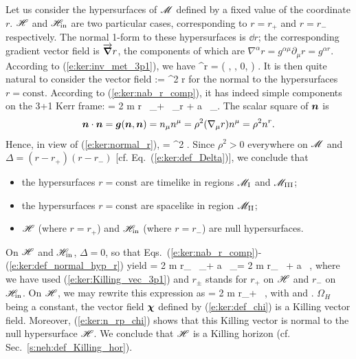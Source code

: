 Let us consider the hypersurfaces of $\mathscr{M}$ defined by a fixed value of
the coordinate $r$. $\mathscr{H}$ and $\mathscr{H}_{\rm in}$ are two particular cases,
corresponding to $r=r_+$ and $r=r_-$ respectively.
The normal 1-form to these hypersurfaces is $\dd r$; the corresponding
gradient vector field is $\overrightarrow{\bm{\nabla}} r$, the components of which are
$\nabla^\alpha r = g^{\alpha\mu} \partial_\mu r = g^{\alpha r}$.
According to (\ref{e:ker:inv_met_3p1}), we have
\be \label{e:ker:nab_r_comp}
    \nabla^\alpha r = \left( , , 0, 
            \right) .
\ee
It is then quite natural to consider the vector field
\be \label{e:ker:def_normal_hyp_r}
     := \rho^2 \vw{\nabla} r
\ee
for the normal to the hypersurfaces $r=\mathrm{const}$. According to (\ref{e:ker:nab_r_comp}),
it has indeed simple components on the 3+1 Kerr frame:
\be \label{e:ker:normal_r}
     = 2 m r \, \wpar_\ti + \Delta \, \wpar_{\tilde r} + a \, \wpar_\tph .
\ee
The scalar square of $\bm{n}$ is
\[
    \bm{n}\cdot\bm{n} = \bm{g}(\bm{n},\bm{n}) = n_\mu n^\mu = \rho^2 (\nabla_\mu r) n^\mu
    = \rho^2 n^r .
\]
Hence, in view of (\ref{e:ker:normal_r}),
\be
    \cdot{} = \rho^2 \Delta .
\ee
Since $\rho^2>0$ everywhere on $\mathscr{M}$ and $\Delta = (r-r_+)(r-r_-)$ [cf. Eq.~(\ref{e:ker:def_Delta})], we conclude that
\begin{itemize}
\item the hypersurfaces $r=\mathrm{const}$ are timelike in regions $\mathscr{M}_{\rm I}$ and $\mathscr{M}_{\rm III}$;
\item the hypersurfaces $r=\mathrm{const}$ are spacelike in region $\mathscr{M}_{\rm II}$;
\item $\mathscr{H}$ (where $r=r_+$) and $\mathscr{H}_{\rm in}$ (where $r=r_-$) are null hypersurfaces.
\end{itemize}

On $\mathscr{H}$ and $\mathscr{H}_{\rm in}$, $\Delta=0$, so that
Eqs.~(\ref{e:ker:nab_r_comp})-(\ref{e:ker:def_normal_hyp_r})
yield
\be \label{e:ker:normal_r_Killing}
     = 2 m r_{\pm} \, \wpar_\ti + a \, \wpar_\tph = 2 m r_{\pm} \, \w{\xi}
        + a \, \w{\eta} ,
\ee
where we have used (\ref{e:ker:Killing_vec_3p1}) and $r_{\pm}$ stands for
$r_+$ on $\mathscr{H}$ and $r_-$ on $\mathscr{H}_{\rm in}$.
On $\mathscr{H}$, we may rewrite this expression as
\be \label{e:ker:n_rp_chi}
     = 2 m r_+ \, \w{\chi} ,
\ee
with
\be \label{e:ker:def_chi}
\ee
and
\be \label{e:ker:def_OmegaH}
    .
\ee
$\Omega_H$ being a constant, the vector field $\bm{\chi}$ defined by
(\ref{e:ker:def_chi}) is a Killing vector field. Moreover, (\ref{e:ker:n_rp_chi})
shows that this Killing vector is normal to the null hypersurface $\mathscr{H}$.
We conclude that $\mathscr{H}$ is a
Killing horizon (cf. Sec.~\ref{s:neh:def_Killing_hor}).

